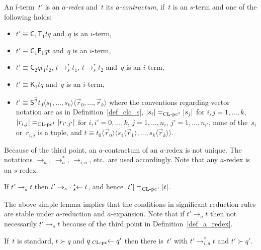\documentclass[a4paper,UKenglish]{lipics-v2016}
\newcommand{\Cs}{\mathsf{C}}
\newcommand{\Fs}{\mathsf{F}}
\newcommand{\Ts}{\mathsf{T}}
\newcommand{\Ss}{\mathsf{S}}
\newcommand{\Ks}{\mathsf{K}}
\newcommand{\from}{\ensuremath{\leftarrow}}
\newcommand{\erase}[1]{\ensuremath{|#1|}}
\newcommand{\la}{\ensuremath{\langle}}
\newcommand{\ra}{\ensuremath{\rangle}}
\newcommand{\leftidx}[3]{{\;\vphantom{#2}}#1\!\!#2#3}
\newcommand{\sCLC}{{\ensuremath{\text{\rm CL-pc}^1}}}
\newcommand{\sCLCz}{\ensuremath{\text{\rm CL-pc}}}
\newcommand{\equiverased}{\succ}
\begin{document}
\begin{definition}\label{def_a_redex}
  An $l$-term~$t'$ is an \emph{$a$-redex} and~$t$ its
  \emph{$a$-contractum}, if~$t$ is an $s$-term and one of the
  following holds:
  \begin{itemize}
  \item $t' \equiv \Cs_1 \Ts_1 t q$ and~$q$ is an $i$-term,
  \item $t' \equiv \Cs_1 \Fs_1 q t$ and~$q$ is an $i$-term,
  \item $t' \equiv \Cs_2 q t_1 t_2$, $t \to_s^{*} t_1$, $t \to_s^{*}
    t_2$ and~$q$ is an $i$-term,
  \item $t' \equiv \Ks_1 t q$ and~$q$ is an $i$-term,
  \item $t' \equiv \Ss^{\vec{n}} t_0 \la s_1,\ldots,s_{k} \ra \la
    \vec{r}_0,\ldots,\vec{r}_k \ra$ where the conventions regarding
    vector notation are as in Definition~\ref{def_clc_s}, $\erase{s_i}
    =_\sCLC \erase{s_j}$ for $i,j=1,\ldots,k$, $\erase{r_{i,j}}
    =_\sCLC \erase{r_{i',j'}}$ for $i,i'=0,\ldots,k$,
    $j=1,\ldots,n_i$, $j'=1,\ldots,n_{i'}$, none of the~$s_{i}$
    or~$r_{i,j}$ is a tuple, and $t \equiv t_0 \la \vec{r}_0 \ra \la
    s_1 \la \vec{r}_1 \ra, \ldots, s_{k} \la \vec{r}_k \ra \ra$.
  \end{itemize}
  Because of the third point, an $a$-contractum of an $a$-redex is not
  unique. The notations $\to_a$, $\to_a^{*}$, $\to_{i,a}$, etc.~are
  used accordingly. Note that any $a$-redex is an $s$-redex.
\end{definition}

\begin{lemma}\label{lem_a_to_erased_equiv}
  If $t' \to_a t$ then $t' \to_s \cdot \leftidx{{}_s^*}{\from} t$, and
  hence $\erase{t'} =_\sCLC \erase{t}$.
\end{lemma}

The above simple lemma implies that the conditions in significant
reduction rules are stable under $a$-reduction and $a$-expansion. Note
that if $t' \to_a t$ then not necessarily $t' \to_s t$ because of the
third point in Definition~\ref{def_a_redex}.

\begin{lemma}\label{lem_erase_expand}
  If~$t$ is standard, $t \equiverased q$ and
  $q \leftidx{{}_{\sCLCz}}{\from} q'$ then there is~$t'$ with
  $t' \to_{i,a}^{*} t$ and $t' \equiverased q'$.
\end{lemma}
\end{document}
